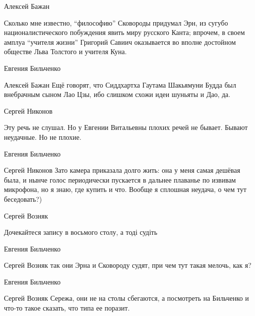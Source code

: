 Алексей Бажан

Сколько мне известно, \enquote{философию} Сковороды придумал Эрн, из сугубо
националистического побуждения явить миру русского Канта; впрочем, в своем
амплуа \enquote{учителя жизни} Григорий Савиич оказывается во вполне достойном обществе
Льва Толстого и учителя Куна.

Евгения Бильченко

Алексей Бажан Ещё говорят, что Сиддхартха Гаутама Шакьямуни Будда был
внебрачным сыном Лао Цзы, ибо слишком схожи идеи шуньяты и Дао, да.

Сергей Никонов

Эту речь не слушал. Но у Евгении Витальевны плохих речей не бывает. Бывают
неудачные. Но не плохие.

Евгения Бильченко

Сергей Никонов Зато камера приказала долго жить: она у меня самая дешёвая была,
и нынче голос периодически пускается в дальнее плаванье по извивам микрофона,
но я знаю, где купить и что. Вообще я сплошная неудача, о чем тут беседовать?)

Сергей Возняк

Дочекайтеся запису в восьмого столу, а тоді судіть

Евгения Бильченко

Сергей Возняк так они Эрна и Сковороду судят, при чем тут такая мелочь, как я?

Евгения Бильченко

Сергей Возняк Сережа, они не на столы сбегаются, а посмотреть на Бильченко и
что-то такое сказать, что типа ее поразит.
